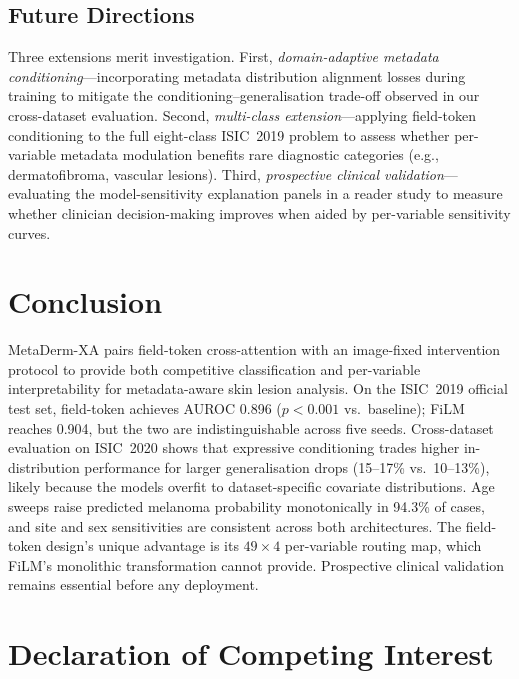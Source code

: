 \documentclass[12pt, a4paper]{article}
\begin{document}
\subsection{Future Directions}

Three extensions merit investigation. First, \emph{domain-adaptive metadata conditioning}---incorporating metadata distribution alignment losses during training to mitigate the conditioning--generalisation trade-off observed in our cross-dataset evaluation. Second, \emph{multi-class extension}---applying field-token conditioning to the full eight-class ISIC~2019 problem to assess whether per-variable metadata modulation benefits rare diagnostic categories (e.g., dermatofibroma, vascular lesions). Third, \emph{prospective clinical validation}---evaluating the model-sensitivity explanation panels in a reader study to measure whether clinician decision-making improves when aided by per-variable sensitivity curves.

\section{Conclusion}
\label{sec:conclusion}

MetaDerm-XA pairs field-token cross-attention with an image-fixed intervention protocol to provide both competitive classification and per-variable interpretability for metadata-aware skin lesion analysis. On the ISIC~2019 official test set, field-token achieves AUROC 0.896 ($p < 0.001$ vs.\ baseline); FiLM reaches 0.904, but the two are indistinguishable across five seeds. Cross-dataset evaluation on ISIC~2020 shows that expressive conditioning trades higher in-distribution performance for larger generalisation drops (15--17\% vs.\ 10--13\%), likely because the models overfit to dataset-specific covariate distributions. Age sweeps raise predicted melanoma probability monotonically in 94.3\% of cases, and site and sex sensitivities are consistent across both architectures. The field-token design's unique advantage is its $49{\times}4$ per-variable routing map, which FiLM's monolithic transformation cannot provide. Prospective clinical validation remains essential before any deployment.

\section*{Declaration of Competing Interest}
\end{document}
